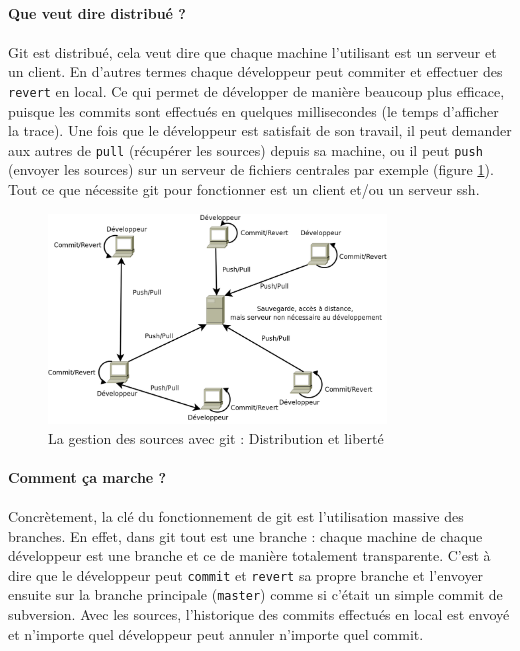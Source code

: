 \paragraph{Que veut dire distribué ?} 
\paragraph{}Git est distribué, cela veut dire que chaque machine l'utilisant est un serveur et un client. En d'autres termes chaque développeur peut commiter et effectuer des \verb|revert| en local. Ce qui permet de développer de manière beaucoup plus efficace, puisque les commits sont effectués en quelques millisecondes (le temps d'afficher la trace). Une fois que le développeur est satisfait de son travail, il peut demander aux autres de \verb|pull| (récupérer les sources) depuis sa machine, ou il peut \verb|push| (envoyer les sources) sur un serveur de fichiers centrales par exemple (figure \ref{git}). Tout ce que nécessite git pour fonctionner est un client et/ou un serveur ssh.


\begin{figure}[!ht]
\begin{center}
        \includegraphics[width=0.8\textwidth]{./schema/git.png}
\caption{La gestion des sources avec git : Distribution et liberté}
\label{git}
\end{center}
\end{figure}




\paragraph{Comment ça marche ?} 
\paragraph{}Concrètement, la clé du fonctionnement de git est l'utilisation massive des branches. En effet, dans git tout est une branche : chaque machine de chaque développeur est une branche et ce de manière totalement transparente. C'est à dire que le développeur peut \verb|commit| et \verb|revert| sa propre branche et l'envoyer ensuite sur la branche principale (\verb|master|) comme si c'était un simple commit de subversion. Avec les sources, l'historique des commits effectués en local est envoyé et n'importe quel développeur peut annuler n'importe quel commit. 

